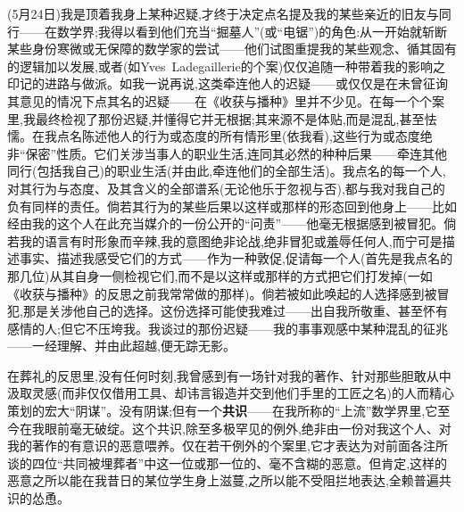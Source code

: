 (5月24日)我是顶着我身上某种迟疑,才终于决定点名提及我的某些亲近的旧友与同行——在数学界;我得以看到他们充当“掘墓人”(或“电锯”)的角色:从一开始就斩断某些身份寒微或无保障的数学家的尝试——他们试图重提我的某些观念、循其固有的逻辑加以发展,或者(如Yves~Ladegaillerie的个案)仅仅追随一种带着我的影响之印记的进路与做派。如我一说再说,这类牵连他人的迟疑——或仅仅是在未曾\dmark{}征询其意见的情况下点其名的迟疑——在《收获与播种》里并不少见。在每一个个案里,我最终检视了那份迟疑,并懂得它并无根据;其来源不是体贴,而是混乱,甚至怯懦。在我点名陈述他人的行为或态度的所有情形里(依我看),这些行为或态度绝非“保密”性质。它们关涉当事人的职业生活,连同其必然的种种后果——牵连其他同行(包括我自己)的职业生活(并由此,牵连他们的全部生活)。我点名的每一个人,对其行为与态度、及其含义的全部谱系(无论他乐于忽视与否),都与我对我自己的负有同样的责任。倘若其行为的某些后果以这样或那样的形态回到他身上——比如经由我的这个人在此充当媒介的一份公开的“问责”——他毫无根据感到被冒犯。倘若我的语言有时形象而辛辣,我的意图绝非论战,绝非冒犯或羞辱任何人,而宁可是描述事实、描述我感受它们的方式——作为一种敦促,促请每一个人(首先是我点名的那几位)从其自身一侧检视它们,而不是以这样或那样的方式把它们打发掉(一如《收获与播种》的反思之前我常常做的那样)。倘若被如此唤起的人选择感到被冒犯,那是关涉他自己的选择。这份选择可能使我难过——出自我所敬重、甚至怀有感情的人;但它不压垮我。我谈过的那份迟疑——我的事事观感中某种混乱的征兆——一经理解、并由此超越,便无踪无影。

在葬礼的反思里,没有任何时刻,我曾感到有一场针对我的著作、针对那些胆敢从中汲取灵感(而非仅仅借用工具、却讳言锻造并交到他们手里的工匠之名)的人而精心策划的宏大“阴谋”。没有阴谋;但有一个\textbf{共识}——在我所称的“上流”数学界里,它至今在我眼前毫无破绽。这个共识,除至多极罕见的例外,绝非由一份对我这个人、对我的著作的有意识的恶意喂养\dmark{}。仅在若干例外的个案里,它才表达为对前面各注所谈的四位“共同被埋葬者”中这一位或那一位的、毫不含糊的恶意。但肯定,这样的恶意之所以能在我昔日的某位学生身上滋蔓,之所以能不受阻拦地表达,全赖普遍共识的怂恿。

